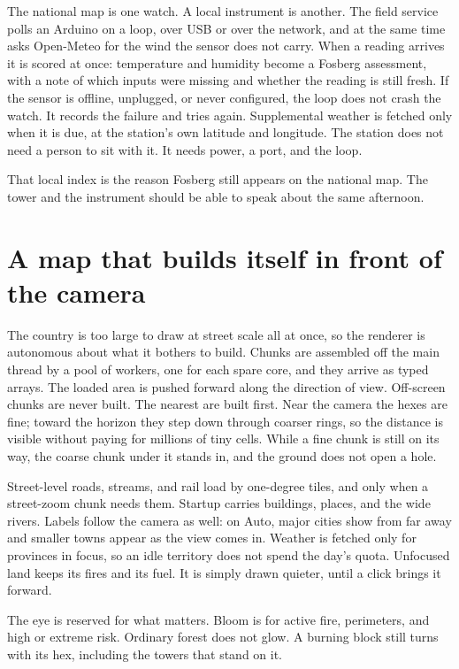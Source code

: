 \documentclass[11pt,a4paper]{article}
\begin{document}
The national map is one watch. A local instrument is another. The field service polls an Arduino on a loop, over USB or over the network, and at the same time asks Open-Meteo for the wind the sensor does not carry. When a reading arrives it is scored at once: temperature and humidity become a Fosberg assessment, with a note of which inputs were missing and whether the reading is still fresh. If the sensor is offline, unplugged, or never configured, the loop does not crash the watch. It records the failure and tries again. Supplemental weather is fetched only when it is due, at the station's own latitude and longitude. The station does not need a person to sit with it. It needs power, a port, and the loop.

That local index is the reason Fosberg still appears on the national map. The tower and the instrument should be able to speak about the same afternoon.

\section{A map that builds itself in front of the camera}

The country is too large to draw at street scale all at once, so the renderer is autonomous about what it bothers to build. Chunks are assembled off the main thread by a pool of workers, one for each spare core, and they arrive as typed arrays. The loaded area is pushed forward along the direction of view. Off-screen chunks are never built. The nearest are built first. Near the camera the hexes are fine; toward the horizon they step down through coarser rings, so the distance is visible without paying for millions of tiny cells. While a fine chunk is still on its way, the coarse chunk under it stands in, and the ground does not open a hole.

Street-level roads, streams, and rail load by one-degree tiles, and only when a street-zoom chunk needs them. Startup carries buildings, places, and the wide rivers. Labels follow the camera as well: on Auto, major cities show from far away and smaller towns appear as the view comes in. Weather is fetched only for provinces in focus, so an idle territory does not spend the day's quota. Unfocused land keeps its fires and its fuel. It is simply drawn quieter, until a click brings it forward.

The eye is reserved for what matters. Bloom is for active fire, perimeters, and high or extreme risk. Ordinary forest does not glow. A burning block still turns with its hex, including the towers that stand on it.
\end{document}
